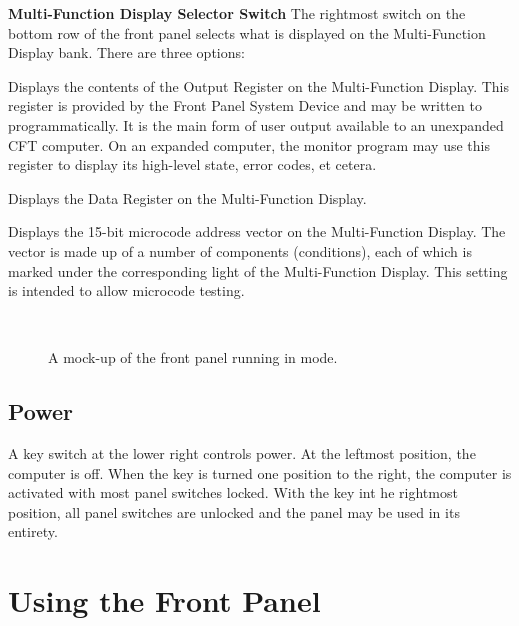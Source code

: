 \begin{description}
\item{\bfseries Multi-Function Display Selector Switch} The rightmost switch
  on the bottom row of the front panel selects what is displayed on
  the Multi-Function Display bank. There are three options:
  \begin{description}
  \item{\bfseries{}} Displays the contents of the Output Register
    on the Multi-Function Display. This register is provided by the
    Front Panel System Device and may be written to
    programmatically. It is the main form of user output available to
    an unexpanded CFT computer. On an expanded computer, the monitor
    program may use this register to display its high-level state,
    error codes, et cetera.
  \item{\bfseries{}} Displays the Data Register on the Multi-Function
    Display.
  \item{\bfseries{}} Displays the 15-bit microcode address
    vector on the Multi-Function Display. The vector is made up of a
    number of components (conditions), each of which is marked under
    the corresponding light of the Multi-Function Display. This
    setting is intended to allow microcode testing.
  \end{description}
\end{description}

\begin{figure}
\centering
{}\\
\caption{\label{fig-panel-terse}A mock-up of the front panel running in  mode.}
\end{figure}

\subsection{Power}

A key switch at the lower right controls power. At the leftmost position, the
computer is off. When the key is turned one position to the right, the computer
is activated with most panel switches locked. With the key int he rightmost
position, all panel switches are unlocked and the panel may be used in its
entirety.

\section{Using the Front Panel}

